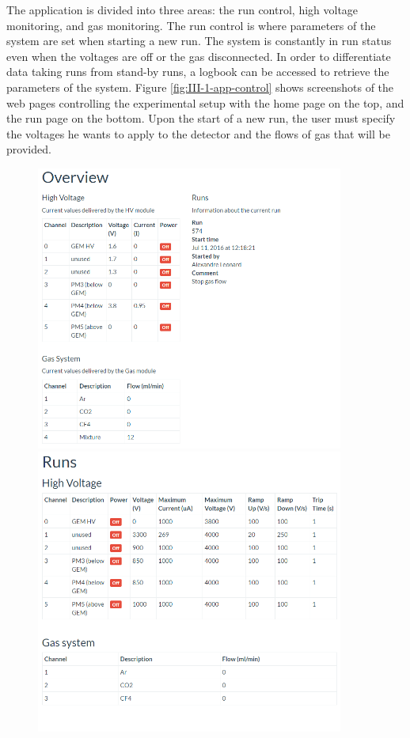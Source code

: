       The application is divided into three areas: the run control, high voltage monitoring, and gas monitoring. The run control is where parameters of the system are set when starting a new run. The system is constantly in run status even when the voltages are off or the gas disconnected. In order to differentiate data taking runs from stand-by runs, a logbook can be accessed to retrieve the parameters of the system. Figure \ref{fig:III-1-app-control} shows screenshots of the web pages controlling the experimental setup with the home page on the top, and the run page on the bottom. Upon the start of a new run, the user must specify the voltages he wants to apply to the detector and the flows of gas that will be provided. \\

      \begin{figure}[p!]
        \centering
        \includegraphics[width=0.9\textwidth]{img/III-1-arch/app-home.png} \\
        \vspace*{0.5cm}
        \includegraphics[width=0.9\textwidth]{img/III-1-arch/app-runs.png}

\end{figure}
